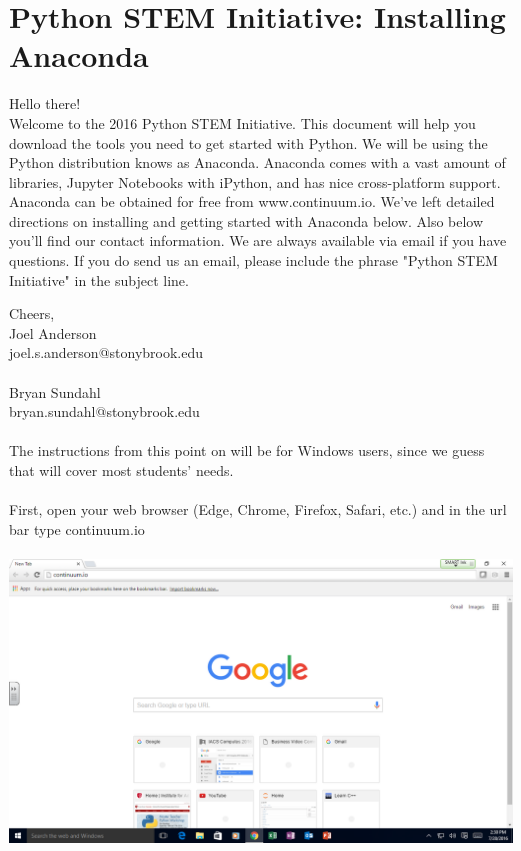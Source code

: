 \documentclass[]{article}
\begin{document}
\section*{Python STEM Initiative: Installing Anaconda}
Hello there! \\

Welcome to the 2016 Python STEM Initiative. This document will help you download the tools you need to get started with Python. We will be using the Python distribution knows as Anaconda. Anaconda comes with a vast amount of libraries, Jupyter Notebooks with iPython, and has nice cross-platform support. Anaconda can be obtained for free from www.continuum.io. We've left detailed directions on installing and getting started with Anaconda below. Also below you'll find our contact information. We are always available via email if you have questions. If you do send us an email, please include the phrase "Python STEM Initiative" in the subject line.

Cheers, \\

Joel Anderson \\
joel.s.anderson@stonybrook.edu\\ \\

Bryan Sundahl \\
bryan.sundahl@stonybrook.edu

\paragraph{}
The instructions from this point on will be for Windows users, since we guess that will cover most students' needs.
\paragraph{}
First, open your web browser (Edge, Chrome, Firefox, Safari, etc.) and in the url bar type continuum.io
\paragraph{}
\begin{centering}
    \centerline{\includegraphics[scale=0.35]{Screenshot_1.png}}
\end{centering}
\end{document}
